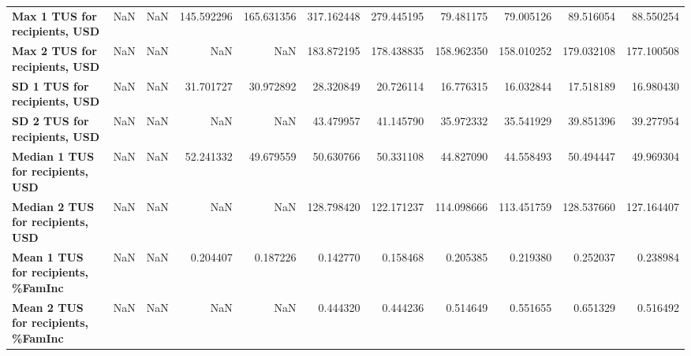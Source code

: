 \begin{longtable}{lrrrrrrrrrr}
\textbf{Max 1 TUS for recipients, USD     } &   NaN &   NaN &   145.592296 &    165.631356 &    317.162448 &    279.445195 &     79.481175 &     79.005126 &    89.516054 &    88.550254 \\
\textbf{Max 2 TUS for recipients, USD     } &   NaN &   NaN &          NaN &           NaN &    183.872195 &    178.438835 &    158.962350 &    158.010252 &   179.032108 &   177.100508 \\
\textbf{SD 1 TUS for recipients, USD      } &   NaN &   NaN &    31.701727 &     30.972892 &     28.320849 &     20.726114 &     16.776315 &     16.032844 &    17.518189 &    16.980430 \\
\textbf{SD 2 TUS for recipients, USD      } &   NaN &   NaN &          NaN &           NaN &     43.479957 &     41.145790 &     35.972332 &     35.541929 &    39.851396 &    39.277954 \\
\textbf{Median 1 TUS for recipients, USD  } &   NaN &   NaN &    52.241332 &     49.679559 &     50.630766 &     50.331108 &     44.827090 &     44.558493 &    50.494447 &    49.969304 \\
\textbf{Median 2 TUS for recipients, USD  } &   NaN &   NaN &          NaN &           NaN &    128.798420 &    122.171237 &    114.098666 &    113.451759 &   128.537660 &   127.164407 \\
\textbf{Mean 1 TUS for recipients, \%FamInc} &   NaN &   NaN &     0.204407 &      0.187226 &      0.142770 &      0.158468 &      0.205385 &      0.219380 &     0.252037 &     0.238984 \\
\textbf{Mean 2 TUS for recipients, \%FamInc} &   NaN &   NaN &          NaN &           NaN &      0.444320 &      0.444236 &      0.514649 &      0.551655 &     0.651329 &     0.516492 \\
\end{longtable}

